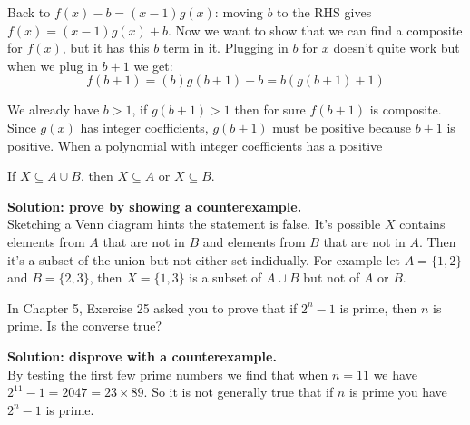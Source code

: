 \documentclass{article}
\begin{document}
Back to $f(x) - b = (x - 1)g(x)$: moving $b$ to the RHS gives $f(x) = (x - 1)g(x) + b$. Now we want to show that we can find a composite for $f(x)$, but it has this $b$ term in it. Plugging in $b$ for $x$ doesn't quite work but when we plug in $b + 1$ we get:
$$f(b + 1) = (b)g(b+1) + b = b(g(b+1) + 1)$$

We already have $b > 1$, if $g(b+1) > 1$ then for sure $f(b + 1)$ is composite. Since $g(x)$ has integer coefficients, $g(b+1)$ must be positive because $b + 1$ is positive. When a polynomial with integer coefficients has a positive

\begin{problem}
If $X \subseteq A \cup B$, then $X \subseteq A$ or $X \subseteq B$.
\end{problem}
\textbf{Solution: prove by showing a counterexample.}
\\

Sketching a Venn diagram hints the statement is false. It's possible $X$ contains elements from $A$ that are not in $B$ and elements from $B$ that are not in $A$. Then it's a subset of the union but not either set indidually. For example let $A = \{1, 2\}$ and $B = \{2, 3\}$, then $X = \{1, 3\}$ is a subset of $A \cup B$ but not of $A$ or $B$.

\begin{problem}
In Chapter 5, Exercise 25 asked you to prove that if $2^n - 1$ is prime, then $n$ is prime. Is the converse true?
\end{problem}
\textbf{Solution: disprove with a counterexample.}
\\

By testing the first few prime numbers we find that when $n = 11$ we have $2^{11} - 1 = 2047 = 23 \times 89$. So it is not generally true that if $n$ is prime you have $2^n - 1$ is prime.
\end{document}
